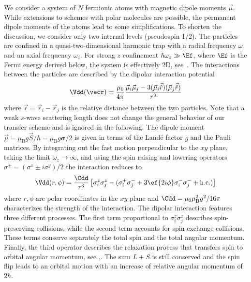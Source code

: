 \noindent
We consider a system of $N$ fermionic atoms with magnetic dipole moments $\vec{\mu}$. While extensions to schemes with polar molecules are possible, the permanent dipole moments of the atoms lead to some simplifications.
To shorten the discussion, we consider only two internal levels (pseudospin 1/2). The particles are confined in a quasi-two-dimensional harmonic trap with a radial frequency $\omega$ and an axial frequency $\omega_z$. For strong $z$ confinement $\hbar\omega_z \gg \Ef$, where $\Ef$ is the Fermi energy derived below, the system is effectively 2D, see~.
The interactions between the particles are described by the dipolar interaction potential
\begin{align*}
\Vdd(\vecr) = \frac{\mu_0}{4\pi}\frac{\vec{\mu}_i  \vec{\mu}_j - 3(\vec{\mu}_i  \vec{\hat{r}})(\vec{\mu}_j \vec{\hat{r}})}{r^3}
\end{align*}
where $\vec{r}=\vec{r}_i-\vec{r}_j$ is the relative distance between the two particles.
Note that a weak $s$-wave scattering length does not change the general behavior of our transfer scheme and is ignored in the following.
The dipole moment $\vec{\mu} =  \mu_\text{B}g \vec{S} / \hbar = \mu_\text{B}g {\boldsymbol\sigma}/2$ is given in terms of the Land\'e factor $g$ and the Pauli matrices. By integrating out the fast motion perpendicular to the $xy$ plane, taking the limit $\omega_z\rightarrow\infty$, and using the spin raising and lowering operators $\sigma^{\pm} = (\sigma^x \pm i \sigma^y)/2$ the interaction reduces to
\begin{align*}
\Vdd(r,\phi) =  \frac{\Cdd}{r^3} \left[
\sigma^z_i \sigma^z_j - (\sigma^+_i \sigma^-_j +3 \ef{2i\phi} \sigma^-_i \sigma^-_j  +\text{h.c.})
\right]
\end{align*}
where $r,\phi$ are polar coordinates in the $xy$ plane and $\Cdd = \mu_0 \mu_\text{B}^2 g^2 / 16\pi$  characterizes the strength of the interaction. The dipolar interaction features three different processes. The first term proportional to $\sigma^z_i\sigma^z_j$ describes spin-preserving collisions, while the second term  accounts for spin-exchange collisions. These terms conserve separately the total spin and the total angular momentum.  Finally, the third operator  describes the relaxation process that transfers spin to orbital angular momentum, see ,. The sum $L+S$ is still conserved and the spin flip leads to an orbital motion with an increase of relative angular momentum of $2\hbar$.

